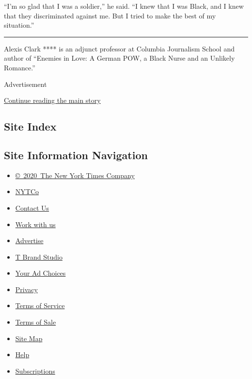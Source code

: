 ``I'm so glad that I was a soldier,'' he said. ``I knew that I was
Black, and I knew that they discriminated against me. But I tried to
make the best of my situation.''

\begin{center}\rule{0.5\linewidth}{\linethickness}\end{center}

Alexis Clark **** is an adjunct professor at Columbia Journalism School
and author of ``Enemies in Love: A German POW, a Black Nurse and an
Unlikely Romance.''

Advertisement

\protect\hyperlink{after-bottom}{Continue reading the main story}

\hypertarget{site-index}{%
\subsection{Site Index}\label{site-index}}

\hypertarget{site-information-navigation}{%
\subsection{Site Information
Navigation}\label{site-information-navigation}}

\begin{itemize}
\tightlist
\item
  \href{https://help.nytimes3xbfgragh.onion/hc/en-us/articles/115014792127-Copyright-notice}{©~2020~The
  New York Times Company}
\end{itemize}

\begin{itemize}
\tightlist
\item
  \href{https://www.nytco.com/}{NYTCo}
\item
  \href{https://help.nytimes3xbfgragh.onion/hc/en-us/articles/115015385887-Contact-Us}{Contact
  Us}
\item
  \href{https://www.nytco.com/careers/}{Work with us}
\item
  \href{https://nytmediakit.com/}{Advertise}
\item
  \href{http://www.tbrandstudio.com/}{T Brand Studio}
\item
  \href{https://www.nytimes3xbfgragh.onion/privacy/cookie-policy\#how-do-i-manage-trackers}{Your
  Ad Choices}
\item
  \href{https://www.nytimes3xbfgragh.onion/privacy}{Privacy}
\item
  \href{https://help.nytimes3xbfgragh.onion/hc/en-us/articles/115014893428-Terms-of-service}{Terms
  of Service}
\item
  \href{https://help.nytimes3xbfgragh.onion/hc/en-us/articles/115014893968-Terms-of-sale}{Terms
  of Sale}
\item
  \href{https://spiderbites.nytimes3xbfgragh.onion}{Site Map}
\item
  \href{https://help.nytimes3xbfgragh.onion/hc/en-us}{Help}
\item
  \href{https://www.nytimes3xbfgragh.onion/subscription?campaignId=37WXW}{Subscriptions}
\end{itemize}
